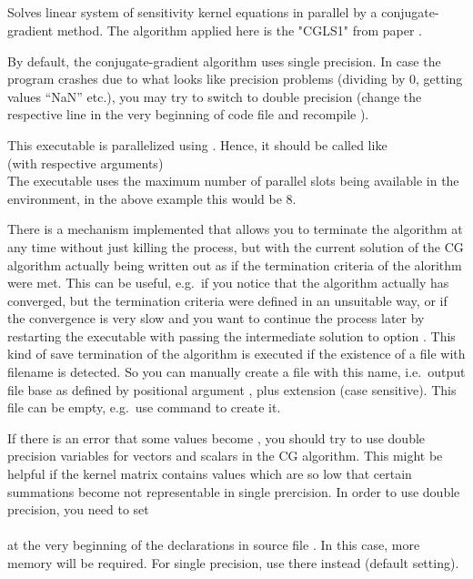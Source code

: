 \subsection{} \label{programs_scripts,sec:bin_prog,sec:solve_cgls_kernel_sys}
Solves linear system of sensitivity kernel equations in parallel by a conjugate-gradient method.
The algorithm applied here is the "CGLS1" from paper \cite{bjorck1998stability}.

By default, the conjugate-gradient algorithm uses single precision. In case the program crashes due to what
looks like precision problems (dividing by 0, getting values ``NaN'' etc.), you may try to switch to 
double precision (change the respective line in the very beginning of code file 
and recompile ).

This executable is parallelized using . Hence, it should be called like\\
 (with respective arguments)\\
The executable uses the maximum number of parallel slots being available in the  environment, in 
the above example this would be 8.

There is a mechanism implemented that allows you to terminate the algorithm at any time without just killing
the process, but with the current solution of the CG algorithm actually being written out as if the termination
criteria of the alorithm were met. 
This can be useful, e.g.\ if you notice that the algorithm actually has converged, but the termination
criteria were defined in an unsuitable way, or if the convergence is very slow and you want to continue
the process later by restarting the executable with passing the intermediate solution to option . 
This kind of save termination of the algorithm is executed if the existence of a file with filename
 is detected. So you can manually create a file with this name, i.e.\ 
output file base as defined by positional argument , plus extension 
(case sensitive). This file can be empty, e.g.\ use command \lcode{touch} to create it.

If there is an error that some values become  , you should try to use double precision
variables for vectors and scalars in the CG algorithm. This might be 
helpful if the kernel matrix contains values which are so low that certain summations 
become not representable in single prercision.
In order to use double precision, you need to set\\
\\
at the very beginning of the declarations in source file  .
In this case, more memory will be required. For single precision, use \lcode{SIZE_REAL} there instead (default
setting).
